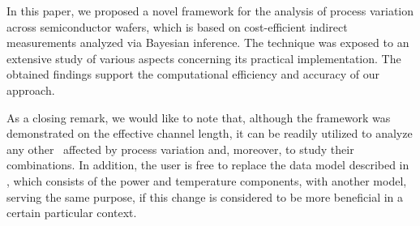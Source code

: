 In this paper, we proposed a novel framework for the analysis of process variation across semiconductor wafers, which is based on cost-efficient indirect measurements analyzed via Bayesian inference.
The technique was exposed to an extensive study of various aspects concerning its practical implementation.
The obtained findings support the computational efficiency and accuracy of our approach.

As a closing remark, we would like to note that, although the framework was demonstrated on the effective channel length, it can be readily utilized to analyze any other \qois\ affected by process variation and, moreover, to study their combinations.
In addition, the user is free to replace the data model described in , which consists of the power and temperature components, with another model, serving the same purpose, if this change is considered to be more beneficial in a certain particular context.
